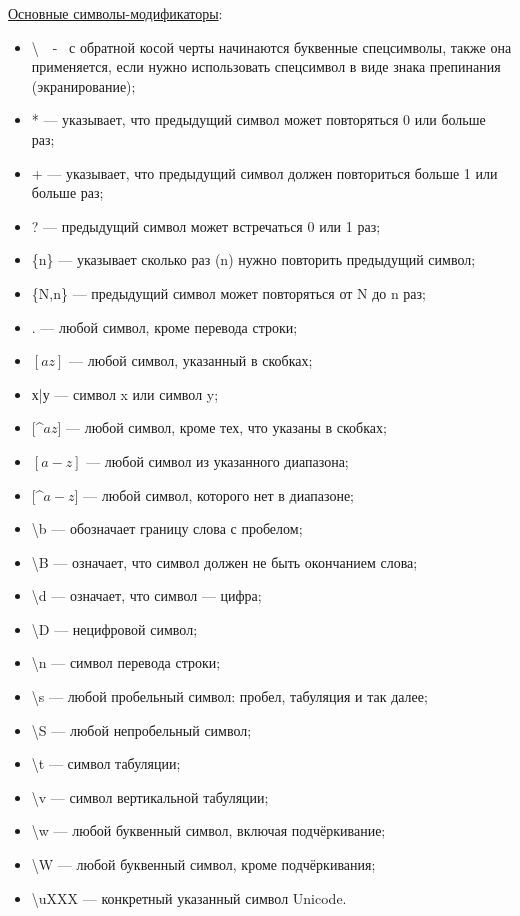 \documentclass[14pt, a4paper]{article}
\begin{document}
\noindent \href{https://losst.pro/regulyarnye-vyrazheniya-linux}{Основные символы-модификаторы}:
\begin{itemize}
    \item \textbackslash \ \ - \ с обратной косой черты начинаются буквенные спецсимволы, также она применяется,
    если нужно использовать спецсимвол в виде знака препинания (экранирование);
    \item * — указывает, что предыдущий символ может повторяться 0 или больше раз;
    \item + — указывает, что предыдущий символ должен повториться больше 1 или больше раз;
    \item ? — предыдущий символ может встречаться 0 или 1 раз;
    \item \{n\} — указывает сколько раз (n) нужно повторить предыдущий символ;
    \item \{N,n\} — предыдущий символ может повторяться от N до n раз;
    \item . — любой символ, кроме перевода строки;
    \item $[az]$ — любой символ, указанный в скобках;
    \item х|у — символ x или символ y;
    \item $[$\string^$az]$ — любой символ, кроме тех, что указаны в скобках;
    \item $[a-z]$ — любой символ из указанного диапазона;
    \item $[$\string^$a-z]$ — любой символ, которого нет в диапазоне;
    \item \textbackslash b — обозначает границу слова с пробелом;
    \item \textbackslash B — означает, что символ должен не быть окончанием слова;
    \item \textbackslash d — означает, что символ — цифра;
    \item \textbackslash D — нецифровой символ;
    \item \textbackslash n — символ перевода строки;
    \item \textbackslash s — любой пробельный символ: пробел, табуляция и так далее;
    \item \textbackslash S — любой непробельный символ;
    \item \textbackslash t — символ табуляции;
    \item \textbackslash v — символ вертикальной табуляции;
    \item \textbackslash w — любой буквенный символ, включая подчёркивание;
    \item \textbackslash W — любой буквенный символ, кроме подчёркивания;
    \item \textbackslash uXXX — конкретный указанный символ Unicode.
\end{itemize}
\end{document}
